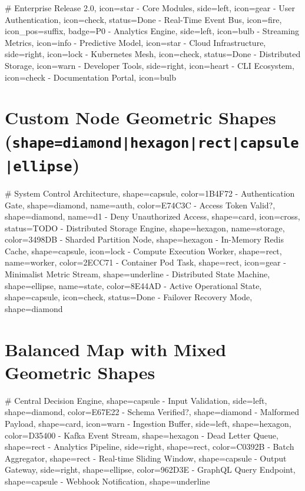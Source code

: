 \documentclass{article}
\begin{document}
\begin{mindchart}[theme=nord, layout=balanced, style=boxed, line=elbow, scale=0.60]
# Enterprise Release 2.0, icon=star
  - Core Modules, side=left, icon=gear
    - User Authentication, icon=check, status=Done
    - Real-Time Event Bus, icon=fire, icon_pos=suffix, badge=P0
  - Analytics Engine, side=left, icon=bulb
    - Streaming Metrics, icon=info
    - Predictive Model, icon=star
  - Cloud Infrastructure, side=right, icon=lock
    - Kubernetes Mesh, icon=check, status=Done
    - Distributed Storage, icon=warn
  - Developer Tools, side=right, icon=heart
    - CLI Ecosystem, icon=check
    - Documentation Portal, icon=bulb
\end{mindchart}

\newpage

\section*{Custom Node Geometric Shapes (\texttt{shape=diamond|hexagon|rect|capsule|ellipse})}

\begin{mindchart}[theme=rainbow, layout=right, style=classic, line=curve, scale=0.68]
# System Control Architecture, shape=capsule, color=1B4F72
  - Authentication Gate, shape=diamond, name=auth, color=E74C3C
    - Access Token Valid?, shape=diamond, name=d1
    - Deny Unauthorized Access, shape=card, icon=cross, status=TODO
  - Distributed Storage Engine, shape=hexagon, name=storage, color=3498DB
    - Sharded Partition Node, shape=hexagon
    - In-Memory Redis Cache, shape=capsule, icon=lock
  - Compute Execution Worker, shape=rect, name=worker, color=2ECC71
    - Container Pod Task, shape=rect, icon=gear
    - Minimalist Metric Stream, shape=underline
  - Distributed State Machine, shape=ellipse, name=state, color=8E44AD
    - Active Operational State, shape=capsule, icon=check, status=Done
    - Failover Recovery Mode, shape=diamond
\end{mindchart}

\vspace{1cm}

\section*{Balanced Map with Mixed Geometric Shapes}

\begin{mindchart}[theme=sunset, layout=balanced, style=classic, line=elbow, scale=0.62]
# Central Decision Engine, shape=capsule
  - Input Validation, side=left, shape=diamond, color=E67E22
    - Schema Verified?, shape=diamond
    - Malformed Payload, shape=card, icon=warn
  - Ingestion Buffer, side=left, shape=hexagon, color=D35400
    - Kafka Event Stream, shape=hexagon
    - Dead Letter Queue, shape=rect
  - Analytics Pipeline, side=right, shape=rect, color=C0392B
    - Batch Aggregator, shape=rect
    - Real-time Sliding Window, shape=capsule
  - Output Gateway, side=right, shape=ellipse, color=962D3E
    - GraphQL Query Endpoint, shape=capsule
    - Webhook Notification, shape=underline
\end{mindchart}
\end{document}
